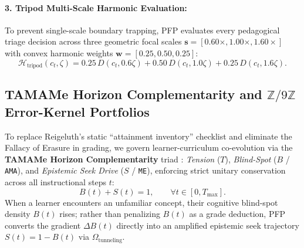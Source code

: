 \documentclass[10pt,twocolumn,a4paper]{article}
\begin{document}
\paragraph{3. Tripod Multi-Scale Harmonic Evaluation:}
To prevent single-scale boundary trapping, PFP evaluates every pedagogical triage decision across three geometric focal scales $\mathbf{s} = [0.60\times, 1.00\times, 1.60\times]$ with convex harmonic weights $\mathbf{w} = [0.25, 0.50, 0.25]$:
\begin{equation}
    \mathcal{H}_{\text{tripod}}(c_t, \zeta) = 0.25\,D(c_t, 0.6\zeta) + 0.50\,D(c_t, 1.0\zeta) + 0.25\,D(c_t, 1.6\zeta).
\end{equation}


\subsection{TAMAMe Horizon Complementarity and $\mathbb{Z}/9\mathbb{Z}$ Error-Kernel Portfolios}
To replace Reigeluth's static ``attainment inventory'' checklist and eliminate the Fallacy of Erasure in grading, we govern learner-curriculum co-evolution via the \textbf{TAMAMe Horizon Complementarity} triad \cite{dagli2026pagecurve}: \textit{Tension} ($T$), \textit{Blind-Spot} ($B$ / \texttt{AMA}), and \textit{Epistemic Seek Drive} ($S$ / \texttt{ME}), enforcing strict unitary conservation across all instructional steps $t$:
\begin{equation}
    B(t) + S(t) = 1, \qquad \forall t \in [0, T_{\max}].
    \label{eq:tamame}
\end{equation}
When a learner encounters an unfamiliar concept, their cognitive blind-spot density $B(t)$ rises; rather than penalizing $B(t)$ as a grade deduction, PFP converts the gradient $\Delta B(t)$ directly into an amplified epistemic seek trajectory $S(t) = 1 - B(t)$ via $\Omega_{\text{tunneling}}$.
\end{document}
